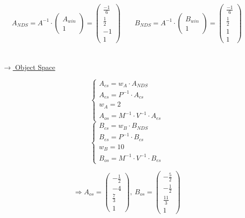 \documentclass[fleqn]{article}
\begin{document}
$$A_{NDS} = A^{-1} \cdot  \begin{pmatrix} A_{win}\\1 \end{pmatrix} =\begin{pmatrix} \frac{-1}{6} \\ \frac{1}{2} \\ -1 \\1 \end{pmatrix}  
\qquad B_{NDS} = A^{-1} \cdot  \begin{pmatrix} B_{win}\\1 \end{pmatrix} =\begin{pmatrix} \frac{-1}{6} \\ \frac{1}{2} \\ 1 \\1 \end{pmatrix}  $$
\\
\\
\underline{$\rightarrow$ Object Space}

\begin{center}
\begin{equation}
    \left\{
        \begin{array}{lr}    
            A_{cs} = w_A\cdot A_{NDS} \\
            A_{es} = P^{-1}\cdot A_{cs} \\
            w_A = 2 \\
            A_{os} = M^{-1} \cdot V^{-1} \cdot A_{es}
        \end{array}
    \right.
\end{equation}
\begin{equation}
    \left\{
        \begin{array}{lr}    
            B_{cs} = w_B\cdot B_{NDS} \\
            B_{es} = P^{-1}\cdot B_{cs} \\
            w_B = 10\\
            B_{os} = M^{-1} \cdot V^{-1} \cdot B_{es}
        \end{array}
    \right.
\end{equation}
\end{center}

$$\Rightarrow A_{os} = \begin{pmatrix} -\frac{1}{2} \\ -4 \\ \frac{7}{3} \\ 1 \end{pmatrix}
,\ B_{os} = \begin{pmatrix} -\frac{5}{2}\\ -\frac{1}{2} \\ \frac{11}{3} \\ 1 \end{pmatrix}$$
\end{document}
